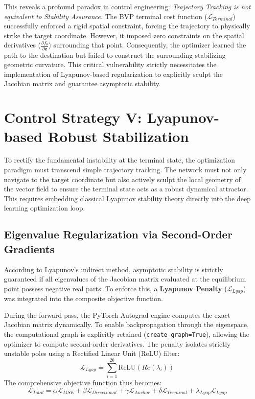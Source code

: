 \documentclass[12pt, a4paper]{article}
\begin{document}
	This reveals a profound paradox in control engineering: \textit{Trajectory Tracking is not equivalent to Stability Assurance.} The BVP terminal cost function ($\mathcal{L}_{Terminal}$) successfully enforced a rigid spatial constraint, forcing the trajectory to physically strike the target coordinate. However, it imposed zero constraints on the spatial derivatives ($\frac{\partial f_\theta}{\partial \mathbf{z}}$) surrounding that point. Consequently, the optimizer learned the path to the destination but failed to construct the surrounding stabilizing geometric curvature. This critical vulnerability strictly necessitates the implementation of Lyapunov-based regularization to explicitly sculpt the Jacobian matrix and guarantee asymptotic stability.
	
	\section{Control Strategy V: Lyapunov-based Robust Stabilization}
	
	To rectify the fundamental instability at the terminal state, the optimization paradigm must transcend simple trajectory tracking. The network must not only navigate to the target coordinate but also actively sculpt the local geometry of the vector field to ensure the terminal state acts as a robust dynamical attractor. This requires embedding classical Lyapunov stability theory directly into the deep learning optimization loop.
	
	\subsection{Eigenvalue Regularization via Second-Order Gradients}
	According to Lyapunov's indirect method, asymptotic stability is strictly guaranteed if all eigenvalues of the Jacobian matrix evaluated at the equilibrium point possess negative real parts. To enforce this, a \textbf{Lyapunov Penalty} ($\mathcal{L}_{Lyap}$) was integrated into the composite objective function.
	
	During the forward pass, the PyTorch Autograd engine computes the exact Jacobian matrix dynamically. To enable backpropagation through the eigenspace, the computational graph is explicitly retained (\texttt{create\_graph=True}), allowing the optimizer to compute second-order derivatives. The penalty isolates strictly unstable poles using a Rectified Linear Unit (ReLU) filter:
	$$ \mathcal{L}_{Lyap} = \sum_{i=1}^{20} \text{ReLU}(Re(\lambda_i)) $$
	The comprehensive objective function thus becomes:
	$$ \mathcal{L}_{Total} = \alpha \mathcal{L}_{MSE} + \beta \mathcal{L}_{Directional} + \gamma \mathcal{L}_{Anchor} + \delta \mathcal{L}_{Terminal} + \lambda_{Lyap} \mathcal{L}_{Lyap} $$
	
\end{document}
